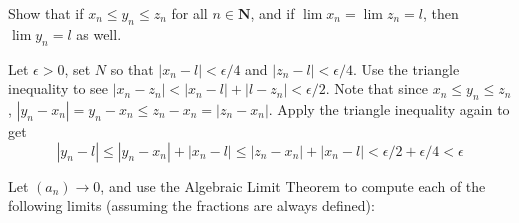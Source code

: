 \begin{exercise}
  Show that if $x_{n} \leq y_{n} \leq z_{n}$ for all $n \in \mathbf{N}$, and if $\lim x_{n}=\lim z_{n}=l$, then $\lim y_{n}=l$ as well.
\end{exercise}

\begin{solution}
  Let $\epsilon > 0$, set $N$ so that $|x_n - l| < \epsilon/4$ and $|z_n - l| < \epsilon/4$. Use the triangle inequality to see $|x_n - z_n| < |x_n-l|+|l-z_n|<\epsilon/2$.
  Note that since $x_n \leq y_n \leq z_n$, $|y_n - x_n| = y_n - x_n \leq z_n - x_n = |z_n - x_n|$.
  Apply the triangle inequality again to get
  $$|y_n - l| \le |y_n - x_n| + |x_n - l| \leq |z_n - x_n| + |x_n - l|< \epsilon/2 + \epsilon/4 < \epsilon$$
\end{solution}

\begin{exercise}
  Let $\left(a_{n}\right) \rightarrow 0$, and use the Algebraic Limit Theorem to compute each of the following limits (assuming the fractions are always defined):
\end{exercise}

\begin{solution}
\end{solution}



